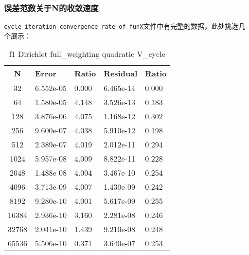 \documentclass[12]{article}%
\begin{document}
\subsubsection{{误差范数关于N的收敛速度}}

\verb|cycle_iteration_convergence_rate_of_funX|文件中有完整的数据，此处挑选几个展示：
\begin{table}[H]
    \centering
    \caption{f1 Dirichlet full\_weighting quadratic V\_cycle}
    \begin{tabular}{|c|l|l|l|l|}
    \hline
    N & Error       & Ratio     & Residual    & Ratio     \\ \hline
 32 & 6.552e-05 & 0.000 & 6.465e-14 & 0.000\\ \hline 
 64 & 1.580e-05 & 4.148 & 3.526e-13 & 0.183\\ \hline 
 128 & 3.876e-06 & 4.075 & 1.168e-12 & 0.302\\ \hline 
 256 & 9.600e-07 & 4.038 & 5.910e-12 & 0.198\\ \hline 
 512 & 2.389e-07 & 4.019 & 2.012e-11 & 0.294\\ \hline 
 1024 & 5.957e-08 & 4.009 & 8.822e-11 & 0.228\\ \hline 
 2048 & 1.488e-08 & 4.004 & 3.467e-10 & 0.254\\ \hline 
 4096 & 3.713e-09 & 4.007 & 1.430e-09 & 0.242\\ \hline 
 8192 & 9.280e-10 & 4.001 & 5.617e-09 & 0.255\\ \hline 
 16384 & 2.936e-10 & 3.160 & 2.281e-08 & 0.246\\ \hline 
 32768 & 2.041e-10 & 1.439 & 9.210e-08 & 0.248\\ \hline 
 65536 & 5.506e-10 & 0.371 & 3.640e-07 & 0.253\\ \hline       \end{tabular}
\end{table}
\end{document}
